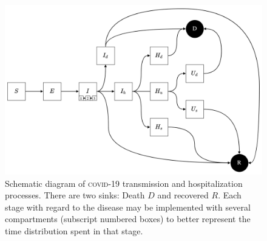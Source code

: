  \begin{figure}[!htb]
\begin{center}
\includegraphics{fig_covid-switzerland-npi/fig_supp/diagram.png}
\caption[Schematic diagram of \textsc{covid}-19 transmission and hospitalization processes]{Schematic diagram of \textsc{covid}-19 transmission and hospitalization processes. There are two sinks: Death $D$ and recovered $R$. Each stage with regard to the disease may be implemented with several compartments (subscript numbered boxes) to better represent the time distribution spent in that stage.}
\label{fig:covid-ch-diagram}
\end{center}
\end{figure}


